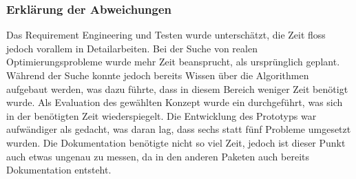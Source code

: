 \subsubsection{Erklärung der Abweichungen}
Das Requirement Engineering und Testen wurde unterschätzt, die Zeit floss jedoch vorallem in Detailarbeiten. Bei der Suche von realen Optimierungsprobleme wurde mehr Zeit beansprucht, als
ursprünglich geplant. Während der Suche konnte jedoch bereits Wissen über die Algorithmen aufgebaut werden, was dazu führte, dass in diesem Bereich weniger Zeit benötigt wurde. Als 
Evaluation des gewählten Konzept wurde ein  durchgeführt, was sich in der benötigten Zeit wiederspiegelt. Die Entwicklung des Prototyps war aufwändiger 
als gedacht, was daran lag, dass sechs statt fünf Probleme umgesetzt wurden. Die Dokumentation benötigte nicht so viel Zeit, jedoch ist dieser Punkt auch etwas ungenau zu 
messen, da in den anderen Paketen auch bereits Dokumentation entsteht.

